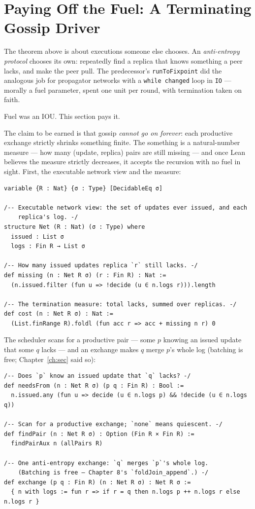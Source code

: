 \documentclass[12pt, a4paper, openright]{book}
\theoremstyle{thmstyle}
\theoremstyle{defstyle}
\newcommand{\lc}[1]{\texttt{#1}}
\begin{document}
\section{Paying Off the Fuel: A Terminating Gossip Driver}

The theorem above is about executions someone else chooses. An
\emph{anti-entropy protocol} chooses its own: repeatedly find a replica
that knows something a peer lacks, and make the peer pull. The
predecessor's \lc{runToFixpoint} did the analogous job for propagator
networks with a \lc{while changed} loop in \lc{IO} --- morally a fuel
parameter, spent one unit per round, with termination taken on faith.

Fuel was an IOU. This section pays it.

The claim to be earned is that gossip \emph{cannot go on forever}: each
productive exchange strictly shrinks something finite. The something is a
natural-number measure --- how many (update, replica) pairs are still
missing --- and once Lean believes the measure strictly decreases, it
accepts the recursion with no fuel in sight. First, the executable
network view and the measure:

\begin{verbatim}
variable {R : Nat} {σ : Type} [DecidableEq σ]

/-- Executable network view: the set of updates ever issued, and each
    replica's log. -/
structure Net (R : Nat) (σ : Type) where
  issued : List σ
  logs : Fin R → List σ

/-- How many issued updates replica `r` still lacks. -/
def missing (n : Net R σ) (r : Fin R) : Nat :=
  (n.issued.filter (fun u => !decide (u ∈ n.logs r))).length

/-- The termination measure: total lacks, summed over replicas. -/
def cost (n : Net R σ) : Nat :=
  (List.finRange R).foldl (fun acc r => acc + missing n r) 0
\end{verbatim}

The scheduler scans for a productive pair --- some $p$ knowing an issued
update that some $q$ lacks --- and an exchange makes $q$ merge $p$'s whole
log (batching is free; Chapter~\ref{ch:sec} said so):

\begin{verbatim}
/-- Does `p` know an issued update that `q` lacks? -/
def needsFrom (n : Net R σ) (p q : Fin R) : Bool :=
  n.issued.any (fun u => decide (u ∈ n.logs p) && !decide (u ∈ n.logs q))

/-- Scan for a productive exchange; `none` means quiescent. -/
def findPair (n : Net R σ) : Option (Fin R × Fin R) :=
  findPairAux n (allPairs R)

/-- One anti-entropy exchange: `q` merges `p`'s whole log.
    (Batching is free — Chapter 8's `foldJoin_append`.) -/
def exchange (p q : Fin R) (n : Net R σ) : Net R σ :=
  { n with logs := fun r => if r = q then n.logs p ++ n.logs r else n.logs r }
\end{verbatim}
\end{document}
